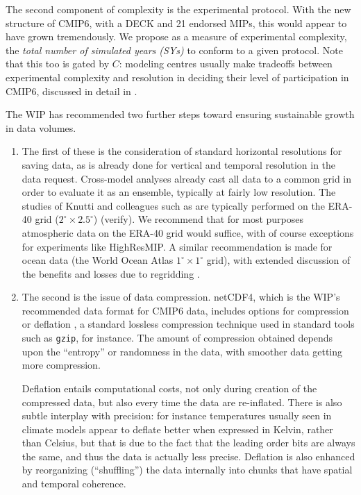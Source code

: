 \documentclass[gmd,manuscript]{copernicus}
\newcommand{\bibref}[1] { \cite{ref:#1}}
\newcommand{\pipref}[1] {\citep{ref:#1}}
\begin{document}
\begin{description}
  The second component of complexity is the experimental protocol.
  With the new structure of CMIP6, with a DECK and 21 endorsed MIPs,
  this would appear to have grown tremendously. We propose as a
  measure of experimental complexity, the \emph{total number of
    simulated years (SYs)} to conform to a given protocol. Note that
  this too is gated by $C$: modeling centres usually make tradeoffs
  between experimental complexity and resolution in deciding their
  level of participation in CMIP6, discussed in detail in
  \bibref{balajietal2017}.
\end{description}

The WIP has recommended two further steps toward ensuring sustainable
growth in data volumes.

\begin{enumerate}
\item The first of these is the consideration of standard horizontal
  resolutions for saving data, as is already done for vertical and
  temporal resolution in the data request. Cross-model analyses
  already cast all data to a common grid in order to evaluate it as an
  ensemble, typically at fairly low resolution. The studies of Knutti
  and colleagues such as \bibref{knuttietal2017} are typically
  performed on the ERA-40 grid ($2^\circ\times 2.5^\circ$) (verify).
  We recommend that for most purposes atmospheric data on the ERA-40
  grid would suffice, with of course exceptions for experiments like
  HighResMIP. A similar recommendation is made for ocean data (the
  World Ocean Atlas $1^\circ\times 1^\circ$ grid), with extended
  discussion of the benefits and losses due to regridding
  \citep[see][]{ref:griffiesetal2014,ref:griffiesetal2016}.
\item The second is the issue of data compression. netCDF4, which is
  the WIP's recommended data format for CMIP6 data, includes options
  for compression or deflation \pipref{zivlempel1977}, a
  standard lossless compression technique used in standard tools such
  as \texttt{gzip}, for instance. The amount of compression obtained
  depends upon the ``entropy'' or randomness in the data, with
  smoother data getting more compression.

  Deflation entails computational costs, not only during creation of
  the compressed data, but also every time the data are re-inflated.
  There is also subtle interplay with precision: for instance
  temperatures usually seen in climate models appear to deflate better
  when expressed in Kelvin, rather than Celsius, but that is due to
  the fact that the leading order bits are always the same, and thus
  the data is actually less precise. Deflation is also enhanced by
  reorganizing (``shuffling'') the data internally into chunks that
  have spatial and temporal coherence.


\end{enumerate}
\end{document}

